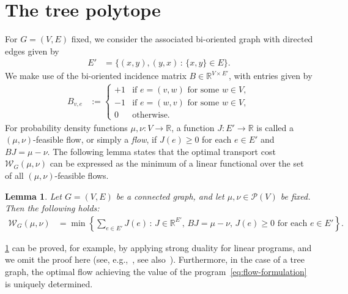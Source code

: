 \documentclass[10pt,a4paper]{amsart}
\newcommand{\prob}{{\mathscr{P}}}
\newcommand{\wass}{{\mathcal{W}}}
\newtheorem{lemma}[theorem]{Lemma}
\begin{document}
    \section{The tree polytope}\label{sec:flow-polytope}

    For $G=(V,E)$ fixed, we consider the associated bi-oriented graph with directed edges given by
        \begin{align}\label{eq:bi-oriented-edges}
            E' &= \{(x,y), (y,x) \,:\, \{x,y\}\in E\}.
        \end{align}
    We make use of the bi-oriented incidence matrix $B\in\mathbb{R}^{V\times E'}$, with entries given by
        \begin{align*}
            B_{v, e} &:= \begin{cases}
                +1 & \text{if } e = (v,w) \text{ for some }w\in V,\\
                -1 & \text{if } e = (w,v) \text{ for some }w\in V,\\
                0 & \text{otherwise}.
            \end{cases}
        \end{align*}
    For probability density functions $\mu,\nu:V\to\mathbb{R}$, a function $J:E'\to\mathbb{R}$ is called a $(\mu,\nu)$-feasible flow, or simply a \emph{flow}, if $J(e)\ge 0$ for each $e\in E'$ and $BJ = \mu-\nu$. The following lemma states that the optimal transport cost $\wass_G(\mu,\nu)$ can be expressed as the minimum of a linear functional over the set of all $(\mu,\nu)$-feasible flows.

    \begin{lemma}\label{lem:flow-formulation}
        Let $G=(V,E)$ be a connected graph, and let $\mu,\nu\in\prob(V)$ be fixed. Then the following holds:
            \begin{align}\label{eq:flow-formulation}
                \wass_G(\mu,\nu) &= \min\left\{\sum_{e\in E'} J(e) \,:\, J\in\mathbb{R}^{E'},\, BJ = \mu-\nu,\, J(e)\ge 0\text{ for each }e\in E'\right\}.
            \end{align}
    \end{lemma}

    \cref{lem:flow-formulation} can be proved, for example, by applying strong duality for linear programs, and we omit the proof here (see, e.g.,~\cite[Ch. 6]{peyre2019computational}, see also~\cite{essid2018quadratically}). Furthermore, in the case of a tree graph, the optimal flow achieving the value of the program~\cref{eq:flow-formulation} is uniquely determined. 
\end{document}
